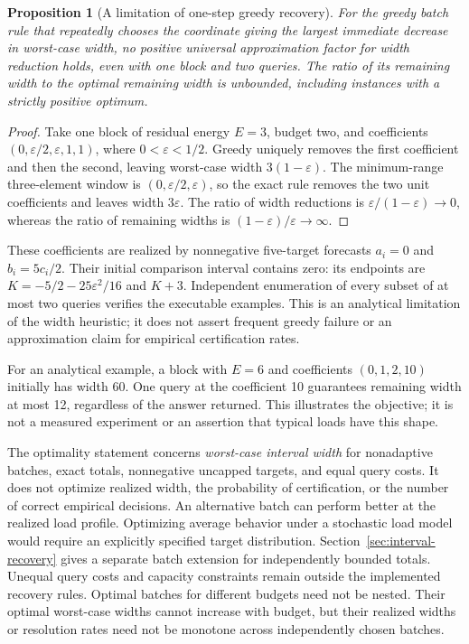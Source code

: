 \documentclass[12pt]{article}
\newtheorem{proposition}{Proposition}
\begin{document}
\begin{proposition}[A limitation of one-step greedy recovery]
For the greedy batch rule that repeatedly chooses the coordinate giving
the largest immediate decrease in worst-case width, no positive universal
approximation factor for width reduction holds, even with one block and
two queries. The ratio of its remaining width to the optimal remaining
width is unbounded, including instances with a strictly positive optimum.
\end{proposition}
\begin{proof}
Take one block of residual energy $E=3$, budget two, and coefficients
$(0,\varepsilon/2,\varepsilon,1,1)$, where $0<\varepsilon<1/2$.
Greedy uniquely removes the first coefficient and then the second,
leaving worst-case width $3(1-\varepsilon)$. The minimum-range
three-element window is $(0,\varepsilon/2,\varepsilon)$, so the exact
rule removes the two unit coefficients and leaves width $3\varepsilon$.
The ratio of width reductions is
$\varepsilon/(1-\varepsilon)\to0$, whereas the ratio of remaining
widths is $(1-\varepsilon)/\varepsilon\to\infty$.
\end{proof}
These coefficients are realized by nonnegative five-target forecasts
$a_i=0$ and $b_i=5c_i/2$. Their initial comparison interval contains
zero: its endpoints are $K=-5/2-25\varepsilon^2/16$ and $K+3$.
Independent enumeration of every subset of at most two queries verifies
the executable examples. This is an analytical limitation of the width
heuristic; it does not assert frequent greedy failure or an approximation
claim for empirical certification rates.

For an analytical example, a block with $E=6$ and coefficients
$(0,1,2,10)$ initially has width 60. One query at the coefficient 10
guarantees remaining width at most 12, regardless of the answer returned.
This illustrates the objective; it is not a measured
experiment or an assertion that typical loads have this shape.

The optimality statement concerns \emph{worst-case interval width} for
nonadaptive batches, exact totals, nonnegative uncapped targets, and equal
query costs. It does not optimize realized width, the probability of
certification, or the number of correct empirical decisions. An alternative
batch can perform better at the realized load profile. Optimizing average behavior under a stochastic load model would require
an explicitly specified target distribution.
Section~\ref{sec:interval-recovery} gives a separate batch extension for
independently bounded totals. Unequal query costs and capacity constraints
remain outside the implemented recovery rules.
Optimal batches for different budgets need not be nested. Their optimal
worst-case widths cannot increase with budget, but their realized widths
or resolution rates need not be monotone across independently chosen batches.
\end{document}
